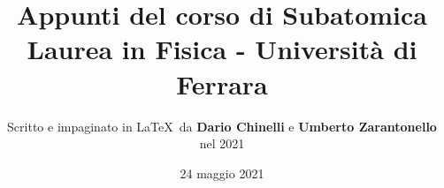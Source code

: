\documentclass[11pt]{article}
\begin{document}
\title{\textbf{Appunti del corso di Subatomica} \\
Laurea in Fisica - Università di Ferrara} 

\author{Scritto e impaginato in \LaTeX\ da \textbf{Dario Chinelli} e \textbf{Umberto Zarantonello} nel 2021}

\date{24 maggio 2021}

\maketitle

\newpage

\tableofcontents

\newpage
























%



% 
\end{document}
